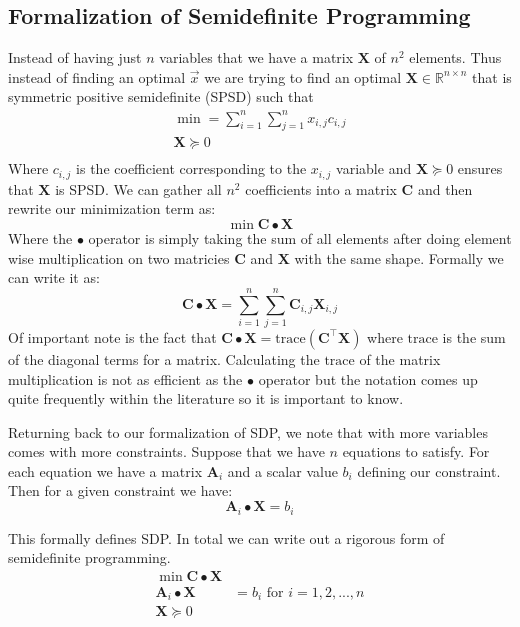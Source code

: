 \documentclass{article}
\begin{document}
\subsection{Formalization of Semidefinite Programming}
Instead of having just \( n \) variables that we have a matrix \( \mathbf{X} \) of \( n^2 \) elements. Thus instead of finding an optimal \( \vec{x} \) we are trying to find an optimal \( \mathbf{X} \in \mathbb{R}^{n \times n} \) that is symmetric positive semidefinite (SPSD) such that
\begin{gather*}
\min = \sum_{i = 1}^n \sum_{j = 1}^n x_{i, j} c_{i , j} \\
\mathbf{X} \succeq 0 \\
\end{gather*}
Where \( c_{i, j} \) is the coefficient corresponding to the \( x_{i, j} \) variable and \( \mathbf{X} \succeq 0 \) ensures that \( \mathbf{X} \) is SPSD. We can gather all \( n^2 \) coefficients into a matrix \( \mathbf{C} \) and then rewrite our minimization term as:
\[
\min \mathbf{C} \bullet \mathbf{X}
\]
Where the \( \bullet \) operator is simply taking the sum of all elements after doing element wise multiplication on two matricies \( \mathbf{C} \) and \( \mathbf{X} \) with the same shape. Formally we can write it as:
\[
  \mathbf{C} \bullet \mathbf{X} = \sum_{i = 1}^n \sum_{j = 1}^n \mathbf{C}_{i, j} \mathbf{X}_{i, j}
\]
Of important note is the fact that \( \mathbf{C} \bullet \mathbf{X} = \text{trace}(\mathbf{C}^\top \mathbf{X}) \) where \( \text{trace} \) is the sum of the diagonal terms for a matrix. Calculating the \( \text{trace} \) of the matrix multiplication is not as efficient as the \( \bullet \) operator but the notation comes up quite frequently within the literature so it is important to know.

Returning back to our formalization of SDP, we note that with more variables comes with more constraints. Suppose that we have \( n \) equations to satisfy. For each equation we have a matrix \( \mathbf{A}_i \) and a scalar value \( b_i \) defining our constraint. Then for a given constraint we have:
\[
\mathbf{A}_i \bullet \mathbf{X} = b_i
\]

This formally defines SDP. In total we can write out a rigorous form of semidefinite programming.
\begin{align*}
  \min \mathbf{C} \bullet \mathbf{X} \\
  \mathbf{A}_i \bullet \mathbf{X} &= b_i  \text{   for } i = 1, 2, ..., n\\
  \mathbf{X} \succeq 0 \\
\end{align*}
\end{document}
